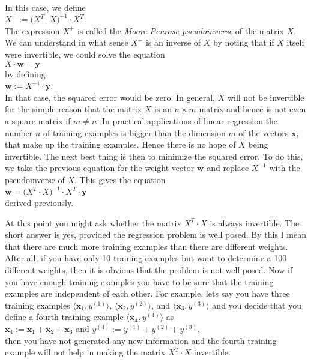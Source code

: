 \\[0.2cm]
In this case, we define 
\\[0.2cm]
\hspace*{1.3cm}
$X^+ := \bigl(X^T \cdot X)^{-1} \cdot X^T$.
\\[0.2cm]
The expression $X^+$ is called the 
\href{https://en.wikipedia.org/wiki/Moore–Penrose_pseudoinverse}{\emph{Moore-Penrose pseudoinverse}} of the matrix $X$.
We can understand in what sense $X^+$ is an inverse of $X$ by noting that if $X$ itself were invertible, we could solve
the equation
\\[0.2cm]
\hspace*{1.3cm}
$X \cdot \mathbf{w} = \mathbf{y}$
\\[0.2cm]
by defining
\\[0.2cm]
\hspace*{1.3cm}
$\mathbf{w} := X^{-1} \cdot \mathbf{y}$.
\\[0.2cm]
In that case, the squared error would be zero.
In general, $X$ will not be invertible for the simple reason that the matrix $X$ is an $n \times m$ matrix and hence is
not even a square matrix if $m \not= n$.  In practical applications of linear regression the number $n$ of training
examples is bigger than the dimension $m$ of the vectors $\mathbf{x}_i$ that make up the training examples.  Hence there
is no hope of $X$ being invertible.  The next best thing is then to minimize the squared error.  To do this, we take the
previous equation for the weight vector $\mathbf{w}$ and replace $X^{-1}$ with the pseudoinverse of $X$.  This gives the
equation 
\\[0.2cm]
\hspace*{1.3cm}
$\mathbf{w} = \bigl(X^T \cdot X)^{-1} \cdot X^T \cdot \mathbf{y}$
\\[0.2cm]
derived previously.

At this point you might ask whether the matrix $X^T \cdot X$ is always invertible.  The short answer is yes, provided the
regression problem is well posed.  By this I mean that there are much more training examples than there are different
weights.  After all, if you have only 10 training examples but want to determine a 100 different weights, then it is
obvious that the problem is not well posed.  Now if you have enough training examples you have to be sure that the
training examples are independent of each other.  For example, lets say you have three training examples 
$\langle\mathbf{x}_1, y^{(1)}\rangle$, $\langle\mathbf{x}_2, y^{(2)}\rangle$, and $\langle\mathbf{x}_3, y^{(3)}\rangle$ and
you decide that you define a fourth training example $\langle\mathbf{x_4}, y^{(4)}\rangle$ as
\\[0.2cm]
\hspace*{1.3cm}
$\mathbf{x}_4 := \mathbf{x}_1 + \mathbf{x}_2 + \mathbf{x}_3$ \quad and \quad 
$y^{(4)} := y^{(1)} + y^{(2)} + y^{(3)}$,
\\[0.2cm]
then you have not generated any new information and the fourth training example will not help in making the matrix 
$X^T \cdot X$ invertible.

